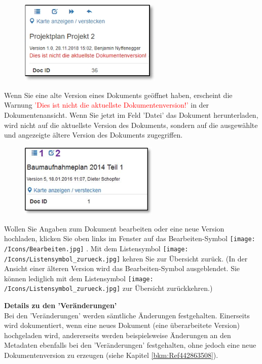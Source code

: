 \begin{figure}
\vspace{-10pt}
\includegraphics[height=40mm]{../chapters/11_Dokumentenablage/pictures/11-2-5_DokumentAeltereVersion.jpg}
\end{figure}
Wenn Sie eine alte Version eines Dokuments geöffnet haben, erscheint die Warnung \textcolor{red}{'Dies ist nicht die aktuellste Dokumentenversion!'} in der Dokumentenansicht. Wenn Sie jetzt im Feld 'Datei' das Dokument herunterladen, wird nicht auf die aktuellste Version des Dokuments, sondern auf die ausgewählte und angezeigte ältere Version des Dokuments zugegriffen.

\begin{figure}
\includegraphics[height=35mm]{../chapters/11_Dokumentenablage/pictures/11-2-5_DokumentBearbeiten.jpg}
\end{figure}
Wollen Sie Angaben zum Dokument bearbeiten oder eine neue Version hochladen, klicken Sie oben links im Fenster auf das Bearbeiten-Symbol \texttt{[image: /Icons/Bearbeiten.jpg]} . Mit dem Listensymbol \texttt{[image: /Icons/Listensymbol\_zurueck.jpg]}  kehren Sie zur Übersicht zurück. (In der Ansicht einer älteren Version wird das Bearbeiten-Symbol ausgeblendet. Sie können lediglich mit dem Listensymbol \texttt{[image: /Icons/Listensymbol\_zurueck.jpg]} zur Übersicht zurückkehren.)

\vspace{\baselineskip}

\textbf{Details zu den 'Veränderungen'} \\
Bei den 'Veränderungen' werden sämtliche Änderungen festgehalten. Einerseits wird dokumentiert, wenn eine neues Dokument (eine überarbeitete Version) hochgeladen wird, andererseits werden beispielsweise Änderungen an den Metadaten ebenfalls bei den 'Veränderungen' festgehalten, ohne jedoch eine neue Dokumentenversion zu erzeugen (siehe Kapitel \ref{bkm:Ref442863508}).

